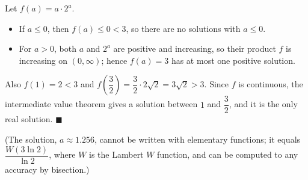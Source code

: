 Let $f(a)=a\cdot2^a$.
\begin{itemize}
\item If $a\le0$, then $f(a)\le0<3$, so there are no solutions with $a\le0$.
\item For $a>0$, both $a$ and $2^a$ are positive and increasing, so their product $f$ is increasing on $(0,\infty)$; hence $f(a)=3$ has at most one positive solution.
\end{itemize}
Also $f(1)=2<3$ and $f\left(\dfrac{3}{2}\right)=\dfrac{3}{2}\cdot2\sqrt2=3\sqrt2>3$. Since $f$ is continuous, the intermediate value theorem gives a solution between $1$ and $\dfrac{3}{2}$, and it is the only real solution. $\blacksquare$

(The solution, $a\approx1.256$, cannot be written with elementary functions; it equals $\dfrac{W(3\ln2)}{\ln2}$, where $W$ is the Lambert $W$ function, and can be computed to any accuracy by bisection.)
